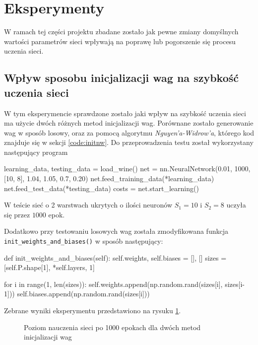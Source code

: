 \documentclass[a4paper,12pt]{article}
\numberwithin{equation}{section}
\begin{document}
\section{Eksperymenty}

W ramach tej części projektu zbadane zostało jak pewne zmiany domyślnych wartości parametrów sieci wpływają na poprawę lub pogorszenie się procesu uczenia sieci.

\subsection{Wpływ sposobu inicjalizacji wag na szybkość uczenia sieci}

W tym eksperymencie sprawdzone zostało jaki wpływ na szybkość uczenia sieci ma użycie dwóch różnych metod inicjalizacji wag. Porównane zostało generowanie wag w sposób losowy, oraz za pomocą algorytmu \textit{Nguyen'a-Widrow'a}, którego kod znajduje się w sekcji \ref{code:initnw}. Do przeprowadzenia testu został wykorzystany następujący program
\begin{pythoncode}
learning_data, testing_data = load_wine()
net = nn.NeuralNetwork(0.01, 1000, [10, 8], 1.04, 1.05, 0.7, 0.20)
net.feed_training_data(*learning_data)
net.feed_test_data(*testing_data)
costs = net.start_learning()
\end{pythoncode}
W teście sieć o 2 warstwach ukrytych o ilości neuronów $S_1=10$ i $S_2=8$ uczyła się przez $1000$ epok.

Dodatkowo przy testowaniu losowych wag została zmodyfikowana funkcja \texttt{init_weights_and_biases()} w sposób następujący:
\begin{pythoncode}
def init_weights_and_biases(self):
    self.weights, self.biases = [], []
    sizes = [self.P.shape[1], *self.layers, 1]

    for i in range(1, len(sizes)):
        self.weights.append(np.random.rand(sizes[i], sizes[i-1]))
        self.biases.append(np.random.rand(sizes[i]))
\end{pythoncode}

\noindent Zebrane wyniki eksperymentu przedstawiono na rysuku \ref{fig:exp_1}.

\begin{figure}[!htpb]
    \centering


    \caption{Poziom nauczenia sieci po 1000 epokach dla dwóch metod inicjalizacji wag}
    \label{fig:exp_1}
\end{figure}
\end{document}
